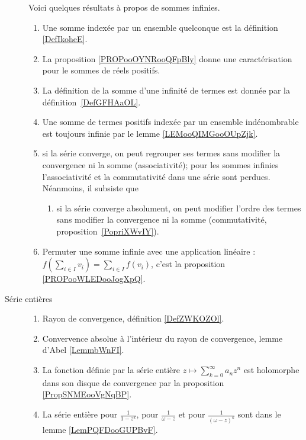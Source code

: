 \begin{description}
		Voici quelques résultats à propos de sommes infinies.%
		\begin{enumerate}
			\item
			      Une somme indexée par un ensemble quelconque est la définition \ref{DefIkoheE}.
			\item
			      La proposition \ref{PROPooOYNRooQFpBly} donne une caractérisation pour le sommes de réels positifs.
			\item
			      La définition de la somme d'une infinité de termes est donnée par la définition~\ref{DefGFHAaOL}.
			\item
			      Une somme de termes positifs indexée par un ensemble indénombrable est toujours infinie par le lemme \ref{LEMooQIMGooOUpZjk}.
			\item
			      si la série converge, on peut regrouper ses termes sans modifier la convergence ni la somme (associativité);
			      pour les sommes infinies l'associativité et la commutativité dans une série sont perdues. Néanmoins, il subsiste que
			      \begin{enumerate}
				      \item
				            si la série converge absolument, on peut modifier l'ordre des termes sans modifier la convergence ni la somme (commutativité, proposition~\ref{PopriXWvIY}).
			      \end{enumerate}
			\item Permuter une somme infinie avec une application linéaire : \( f(\sum_{i\in I}v_i)=\sum_{i\in I}f(v_i)\), c'est la proposition \ref{PROPooWLEDooJogXpQ}.
		\end{enumerate}
	\item[Série entières]
		\begin{enumerate}
			\item
			      Rayon de convergence, définition \ref{DefZWKOZOl}.
			\item
			      Convervence absolue à l'intérieur du rayon de convergence, lemme d'Abel \ref{LemmbWnFI}.
			\item
			      La fonction définie par la série entière  \(z\mapsto \sum_{k=0}^{\infty}a_nz^n\) est holomorphe dans son disque de convergence par la proposition \ref{PropSNMEooVgNqBP}.
			\item
			      La série entière pour \( \frac{1}{ 1-z^k }\), pour \( \frac{1}{ \omega-z }\) et pour \( \frac{1}{ (\omega-z)^k }\) sont dans le lemme \ref{LemPQFDooGUPBvF}.
		\end{enumerate}
\end{description}
